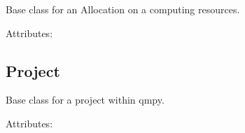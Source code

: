 \documentclass[letterpaper,10pt,english]{sphinxmanual}
\begin{document}
\begin{fulllineitems}
\label{models:qmpy.Allocation}
Base class for an Allocation on a computing resources.
\begin{description}
\item[{Attributes:}] \leavevmode
{}

\end{description}

\end{fulllineitems}



\subsection{Project}
\label{models:project}

\begin{fulllineitems}
\label{models:qmpy.Project}
Base class for a project within qmpy.
\begin{description}
\item[{Attributes:}] \leavevmode
{}

\end{description}

\end{fulllineitems}
\end{document}
